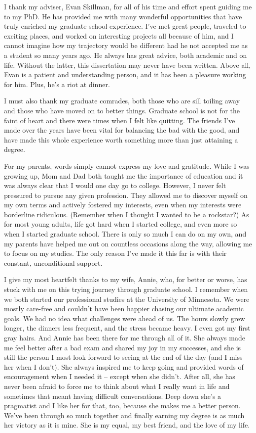 I thank my adviser, Evan Skillman, for all of his time and effort spent guiding
me to my PhD. He has provided me with many wonderful opportunities that have
truly enriched my graduate school experience. I've met great people, traveled
to exciting places, and worked on interesting projects all because of him, and
I cannot imagine how my trajectory would be different had he not accepted me as
a student so many years ago. He always has great advice, both academic and on
life. Without the latter, this dissertation may never have been written. Above
all, Evan is a patient and understanding person, and it has been a pleasure
working for him. Plus, he's a riot at dinner.

I must also thank my graduate comrades, both those who are sill toiling away
and those who have moved on to better things. Graduate school is not for the
faint of heart and there were times when I felt like quitting. The friends I've
made over the years have been vital for balancing the bad with the good, and
have made this whole experience worth something more than just attaining a
degree.

For my parents, words simply cannot express my love and gratitude. While I was
growing up, Mom and Dad both taught me the importance of education and it was
always clear that I would one day go to college. However, I never felt
pressured to pursue any given profession. They allowed me to discover myself on
my own terms and actively fostered my interests, even when my interests were
borderline ridiculous. (Remember when I thought I wanted to be a rockstar?) As
for most young adults, life got hard when I started college, and even more so
when I started graduate school. There is only so much I can do on my own, and
my parents have helped me out on countless occasions along the way, allowing me
to focus on my studies. The only reason I've made it this far is with their
constant, unconditional support.

I give my most heartfelt thanks to my wife, Annie, who, for better or worse,
has stuck with me on this trying journey through graduate school. I remember
when we both started our professional studies at the University of Minnesota.
We were mostly care-free and couldn't have been happier chasing our ultimate
academic goals. We had no idea what challenges were ahead of us. The hours
slowly grew longer, the dinners less frequent, and the stress became heavy. I
even got my first gray hairs. And Annie has been there for me through all of
it. She always made me feel better after a bad exam and shared my joy in my
successes, and she is still the person I most look forward to seeing at the end
of the day (and I miss her when I don't). She always inspired me to keep going
and provided words of encouragement when I needed it -- except when she didn't.
After all, she has never been afraid to force me to think about what I really
want in life and sometimes that meant having difficult conversations. Deep down
she's a pragmatist and I like her for that, too, because she makes me a better
person. We've been through so much together and finally earning my degree is as
much her victory as it is mine. She is my equal, my best friend, and the love
of my life.
